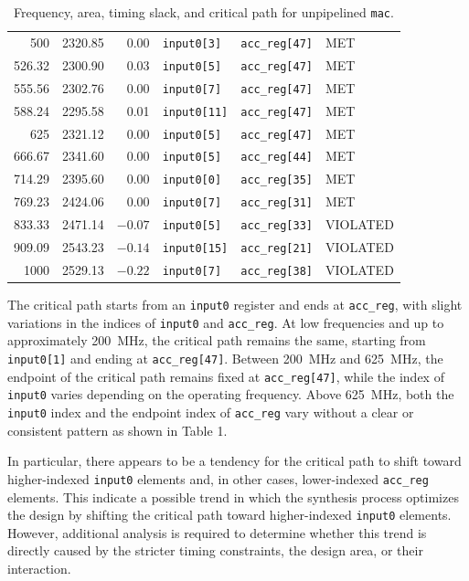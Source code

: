 \documentclass[a4paper,11pt]{article}
\begin{document}
\begin{table}[htbp]
\begin{tabular}{r r r l l l}
        500     & 2320.85 & 0.00   & \texttt{input0[3]}  & \texttt{acc\_reg[47]} & MET \\
        526.32  & 2300.90 & 0.03   & \texttt{input0[5]}  & \texttt{acc\_reg[47]} & MET \\
        555.56  & 2302.76 & 0.00   & \texttt{input0[7]}  & \texttt{acc\_reg[47]} & MET \\
        588.24  & 2295.58 & 0.01   & \texttt{input0[11]} & \texttt{acc\_reg[47]} & MET \\
        625     & 2321.12 & 0.00   & \texttt{input0[5]}  & \texttt{acc\_reg[47]} & MET \\
        666.67  & 2341.60 & 0.00   & \texttt{input0[5]}  & \texttt{acc\_reg[44]} & MET \\
        714.29  & 2395.60 & 0.00   & \texttt{input0[0]}  & \texttt{acc\_reg[35]} & MET \\
        769.23  & 2424.06 & 0.00   & \texttt{input0[7]}  & \texttt{acc\_reg[31]} & MET \\
        833.33  & 2471.14 & $-0.07$ & \texttt{input0[5]}  & \texttt{acc\_reg[33]} & VIOLATED \\
        909.09  & 2543.23 & $-0.14$ & \texttt{input0[15]} & \texttt{acc\_reg[21]} & VIOLATED \\
        1000    & 2529.13 & $-0.22$ & \texttt{input0[7]}  & \texttt{acc\_reg[38]} & VIOLATED \\
        \bottomrule
    \end{tabular}
    \caption{Frequency, area, timing slack, and critical path for unpipelined \texttt{mac}.}
    \label{tab:frequency-area-slack-path}
\end{table}

The critical path starts from an \texttt{input0} register and ends at \texttt{acc\_reg}, with slight variations in the indices of \texttt{input0} and \texttt{acc\_reg}. At low frequencies and up to approximately 200~MHz, the critical path remains the same, starting from \texttt{input0[1]} and ending at \texttt{acc\_reg[47]}. Between 200~MHz and 625~MHz, the endpoint of the critical path remains fixed at \texttt{acc\_reg[47]}, while the index of \texttt{input0} varies depending on the operating frequency. Above 625~MHz, both the \texttt{input0} index and the endpoint index of \texttt{acc\_reg} vary without a clear or consistent pattern as shown in Table 1.

In particular, there appears to be a tendency for the critical path to shift toward higher-indexed \texttt{input0} elements and, in other cases, lower-indexed \texttt{acc\_reg} elements. This indicate a possible trend in which the synthesis process optimizes the design by shifting the critical path toward higher-indexed \texttt{input0} elements. However, additional analysis is required to determine whether this trend is directly caused by the stricter timing constraints, the design area, or their interaction. 
\end{document}
